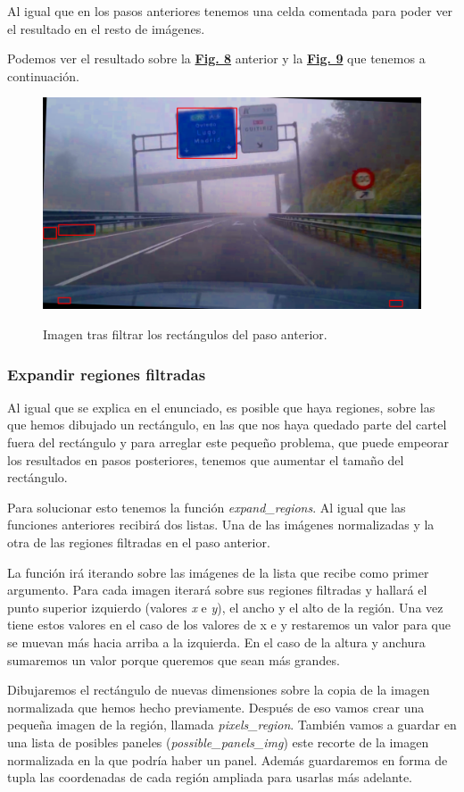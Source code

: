 \documentclass[a4paper, 12pt]{article}
\begin{document}
Al igual que en los pasos anteriores tenemos una celda comentada para poder ver el resultado en el resto de imágenes. 

Podemos ver el resultado sobre la \textbf{\hyperref[fig:Rectangulos]{Fig. 8}} anterior y la \textbf{\hyperref[fig:RectangulosFiltrados]{Fig. 9}} que tenemos a continuación.
\begin{figure}[h]
	\centering
	\caption{Imagen tras filtrar los rectángulos del paso anterior.}\vspace{0.5cm}
	\includegraphics[width=0.6\linewidth]{img/RectangulosFiltrados}
	\label{fig:RectangulosFiltrados}
\end{figure}


\subsubsection{Expandir regiones filtradas}
Al igual que se explica en el enunciado, es posible que haya regiones, sobre las que hemos dibujado un rectángulo, en las que nos haya quedado parte del cartel fuera del rectángulo y para arreglar este pequeño problema, que puede empeorar los resultados en pasos posteriores, tenemos que aumentar el tamaño del rectángulo.

Para solucionar esto tenemos la función \textit{expand\_regions}. Al igual que las funciones anteriores recibirá dos listas. Una de las imágenes normalizadas y la otra de las regiones filtradas en el paso anterior.

La función irá iterando sobre las imágenes de la lista que recibe como primer argumento. Para cada imagen iterará sobre sus regiones filtradas y hallará el punto superior izquierdo (valores \textit{x} e \textit{y}), el ancho y el alto de la región. Una vez tiene estos valores en el caso de los valores de x e y restaremos un valor para que se muevan más hacia arriba a la izquierda. En el caso de la altura y anchura sumaremos un valor porque queremos que sean más grandes. 

Dibujaremos el rectángulo de nuevas dimensiones sobre la copia de la imagen normalizada que hemos hecho previamente. Después de eso vamos crear una pequeña imagen de la región, llamada \textit{pixels\_region}. 
También vamos a guardar en una lista de posibles paneles (\textit{possible\_panels\_img}) este recorte de la imagen normalizada en la que podría haber un panel. Además guardaremos en forma de tupla las coordenadas de cada región ampliada para usarlas más adelante. 
\end{document}
